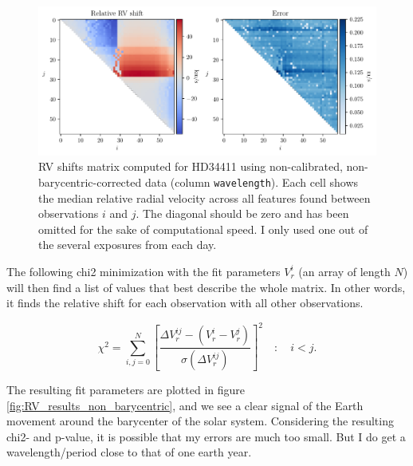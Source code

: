    \begin{figure}%
        \begin{wide}  
            \includegraphics[width=\textwidth]{figures/shfits_matrix_non_bary.pdf}
            \caption{RV shifts matrix computed for HD34411 using non-calibrated, non-barycentric-corrected data (column \texttt{wavelength}). Each cell shows the median relative radial velocity across all features found between observations $i$ and $j$. The diagonal should be zero and has been omitted for the sake of computational speed. I only used one out of the several exposures from each day.}
        \label{fig:shift_matrix}
        \end{wide}
    \end{figure}
            
    The following chi2 minimization with the fit parameters $V_r^i$ (an array of length $N$) will then find a list of values that best describe the whole matrix. In other words, it finds the relative shift for each observation with all other observations. 

    \begin{equation}
        \label{eq:matrix_reduction_fit}
        \chi^{2}=\sum_{i,j = 0}^{N}\left[\frac{ \Delta V_{r}^{ij} - (V_r^i - V_r^j) }{\sigma(\Delta V_{r}^{ij})}\right]^{2} \quad : \quad i < j.
    \end{equation}
    
    The resulting fit parameters are plotted in figure \ref{fig:RV_results_non_barycentric}, and we see a clear signal of the Earth movement around the barycenter of the solar system. Considering the resulting chi2- and p-value, it is possible that my errors are much too small. But I do get a wavelength/period close to that of one earth year.

